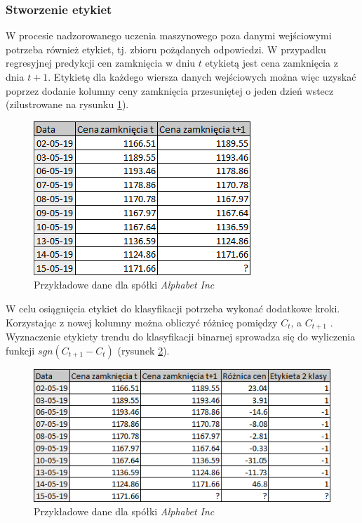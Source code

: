 \documentclass[a4paper, twoside, 11pt, openright]{article}
\begin{document}
\subsubsection{Stworzenie etykiet}

W procesie nadzorowanego uczenia maszynowego poza danymi wejściowymi potrzeba również etykiet, tj. zbioru pożądanych odpowiedzi. W przypadku regresyjnej predykcji cen zamknięcia w dniu $t$ etykietą jest cena zamknięcia z dnia $t+1$. Etykietę dla każdego wiersza danych wejściowych można więc uzyskać poprzez dodanie kolumny ceny zamknięcia przesuniętej o jeden dzień wstecz (zilustrowane na rysunku \ref{regression_label_creation}). 

\begin{figure}[H]
\centering 
\includegraphics[scale=0.9]{img/label_creation.png}
\caption{Przykładowe dane dla spółki \textit{Alphabet Inc}}
\label{regression_label_creation}
\end{figure}

W celu osiągnięcia etykiet do klasyfikacji potrzeba wykonać dodatkowe kroki. Korzystając z nowej kolumny można obliczyć różnicę pomiędzy $C_t$, a $C_{t+1}$ . Wyznaczenie etykiety trendu do klasyfikacji binarnej sprowadza się do wyliczenia funkcji $sgn(C_{t+1}-C_{t})$ (rysunek \ref{binary_label_creation}). 

\begin{figure}[H]
\centering 
\includegraphics[scale=0.9]{img/label_creation2.png}
\caption{Przykładowe dane dla spółki \textit{Alphabet Inc}}
\label{binary_label_creation}
\end{figure}
\end{document}
